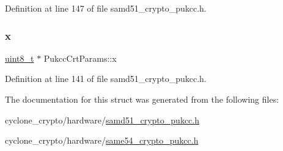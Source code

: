 Definition at line 147 of file samd51\+\_\+crypto\+\_\+pukcc.\+h.

\mbox{\label{structPukccCrtParams_a6c5224e7eeb561b0341976d0390ec44d}} 
\subsubsection{\texorpdfstring{x}{x}}
{\footnotesize\ttfamily \hyperlink{stdint_8h_aba7bc1797add20fe3efdf37ced1182c5}{uint8\+\_\+t} $\ast$ Pukcc\+Crt\+Params\+::x}



Definition at line 141 of file samd51\+\_\+crypto\+\_\+pukcc.\+h.



The documentation for this struct was generated from the following files\+:\begin{DoxyCompactItemize}
\item 
cyclone\+\_\+crypto/hardware/\hyperlink{samd51__crypto__pukcc_8h}{samd51\+\_\+crypto\+\_\+pukcc.\+h}\item 
cyclone\+\_\+crypto/hardware/\hyperlink{same54__crypto__pukcc_8h}{same54\+\_\+crypto\+\_\+pukcc.\+h}\end{DoxyCompactItemize}
